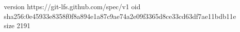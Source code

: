 version https://git-lfs.github.com/spec/v1
oid sha256:0e45933e8358f0f8a894e1a87c9ae74a2e09f3365d8ce33cd63df7ae11bdb11e
size 2191
